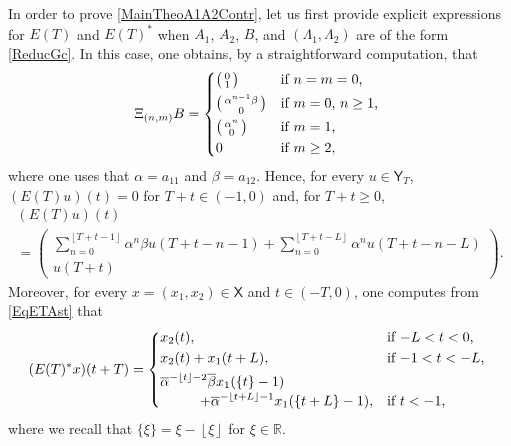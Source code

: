 \documentclass[10pt]{amsart}
\newenvironment{smallpmatrix}{\big(\begin{smallmatrix}}{\end{smallmatrix}\big)}
\theoremstyle{plain}
\theoremstyle{definition}
\newcommand{\floor}[1]{\left\lfloor #1 \right\rfloor}
\begin{document}
In order to prove \eqref{MainTheoA1A2Contr}, let us first provide explicit expressions for $E(T)$ and $E(T)^\ast$ when $A_1$, $A_2$, $B$, and $(\Lambda_1, \Lambda_2)$ are of the form \eqref{ReducGc}. In this case, one obtains, by a straightforward computation, that
\begin{equation}%
\Xi_{(n, m)} B =
\begin{dcases*}
\begin{smallpmatrix}0 \\ 1 \\\end{smallpmatrix} & if $n = m = 0$, \\
\begin{smallpmatrix}\alpha^{n-1} \beta \\ 0 \\\end{smallpmatrix} & if $m = 0$, $n \geq 1$, \\
\begin{smallpmatrix}\alpha^{n} \\ 0 \\\end{smallpmatrix} & if $m = 1$, \\
0 & if $m \geq 2$,
\end{dcases*}
\end{equation}
where one uses that $\alpha \!=\! a_{11}$ and $\beta \!=\! a_{12}$. Hence, for every $u \in \mathsf Y_T$, $(E(T) u)(t) \!=\! 0$ for $T + t \in (-1, 0)$ and, for $T + t \geq 0$,
\begin{multline}
\label{Case4ExplicitE}
(E(T) u)(t)\\[-7pt]
= \begin{pmatrix}\displaystyle \sum_{n=0}^{\floor{T + t - 1}} \alpha^{n} \beta u(T + t - n - 1) + \sum_{n=0}^{\floor{T + t - L}} \alpha^n u(T + t - n - L) \\ u(T + t)\end{pmatrix}.
\end{multline}
Moreover, for every $x = (x_1, x_2) \in \mathsf X$ and $t \in (-T, 0)$, one computes from \eqref{EqETAst} that
\begin{equation}
\label{ETAstUtPlusT}
(E(T)^\ast x)(t + T) = \begin{dcases*}
x_2(t), & if $-L < t < 0$, \\
x_2(t) + x_1(t + L), & if $-1 < t < -L$, \\
\overline\alpha^{-\floor{t} - 2} \overline\beta x_1(\{t\} - 1)\\[-3pt]
\hspace*{1cm} + \overline\alpha^{-\floor{t + L} - 1} x_1(\{t + L\} - 1), & if $t < -1$,
\end{dcases*}
\end{equation}
where we recall that $\{\xi\} = \xi - \floor{\xi}$ for $\xi \in \mathbb R$.
\end{document}
